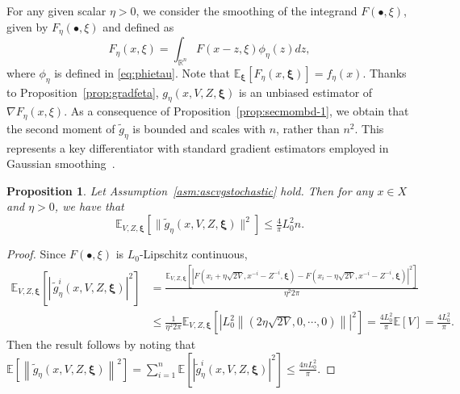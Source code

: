 \documentclass[11pt,reqno]{amsart}
\newcommand{\1}{{\bf 1}}
\newcommand{\2}{{\bf 2}}
\newcommand{\pc}[1]{{\color{cyan}#1}}
\newcommand{\bxi}{\boldsymbol{\xi}}
\newcommand{\E}{\mathbb E}
\newcommand{\lc}{\left[}
\newcommand{\rc}{\right]}
\newcommand{\lln}{\left|}
\newcommand{\rrn}{\right|}
\newcommand{\lnn}{\left\|}
\newcommand{\rnn}{\right\|}
\numberwithin{equation}{section}
\newtheorem{proposition}{Proposition}[section]
\theoremstyle{remark}
\begin{document}
{		For any given scalar $\eta > 0$, we consider the smoothing of the integrand $F(\bullet,\xi)$, given by $F_{\eta}(\bullet,\xi)$ and defined as
		\begin{equation}
			F_{\eta}(x,\xi)= \int_{\mathbb{R}^n} F(x-z,\xi) \phi_{\eta}(z) dz,
		\end{equation}
		where $\phi_\eta$ is defined in \eqref{eq:phietau}. Note that $\E_{\bxi}[F_{\eta}(x, \bxi)] = f_{\eta}(x)$. Thanks to Proposition~\ref{prop:gradfeta}, $g_\eta(x, V,Z, \bxi)$ is an unbiased estimator of $\nabla F_{\eta}(x,\xi)$.
		As a consequence of Proposition~\ref{prop:secmombd-1}, we obtain that the second moment of $\tilde{g}_\eta$ is bounded and scales with $n$, rather than $n^2$. This represents a key differentiator with standard gradient estimators employed in Gaussian smoothing~\cite{nesterov2017random}. 
		\begin{proposition}\label{prop:secmombd}
			Let Assumption~\ref{asm:ascvgstochastic} hold. Then for any $x \in X$ and $\eta > 0$, we have that
			\begin{equation}
				\mathbb{E}_{V,Z,\bxi} \lc \|\tilde{g}_\eta(x,V,Z,\bxi)\|^2 \rc \leq \tfrac{4}{\pi}L_0^2n.
			\end{equation}
		\end{proposition}
		\begin{proof}
			Since $F(\bullet,\xi)$ is $L_0$-Lipschitz continuous, 
			\begin{align*}
				\mathbb{E}_{{V,Z,\bxi}}\left[\left|\, \tilde g_{\eta}^i\left(x,V,Z,\bxi\right)\right|^2\right]& = \tfrac{\mathbb{E}_{{V,Z,\bxi}}\left[\left|F\left(x_i+\eta\sqrt{2V},x^{-i}-Z^{-i},\bxi\right)-F\left(x_i-\eta\sqrt{2V},x^{-i}-Z^{-i},\bxi\right)\right|^2\right]}{\eta^2 2\pi}\\
				& \leq \tfrac{1}{\eta^2 2\pi}\mathbb{E}_{{V,Z,\bxi}}\left[\left|L_0^2 \left\|(2\eta\sqrt{2V},0,\cdots,0)\right\|\right|^2 \right] =  \tfrac{4L_0^2}{\pi}\mathbb{E}[V]=\tfrac{4L_0^2}{\pi}.
			\end{align*}
			Then the result follows by noting that $\mathbb{E}\left[\left\|\tilde{g}_{\eta}(x,V,Z,\bxi)\right\|^2\right]=\sum_{i=1}^n \mathbb{E}\left[\left|\tilde{g}_{\eta}^i(x,V,Z,\bxi)\right|^2\right]\leq \tfrac{4nL_0^2}{\pi} .$
			\end{proof}
			
}
\end{document}

